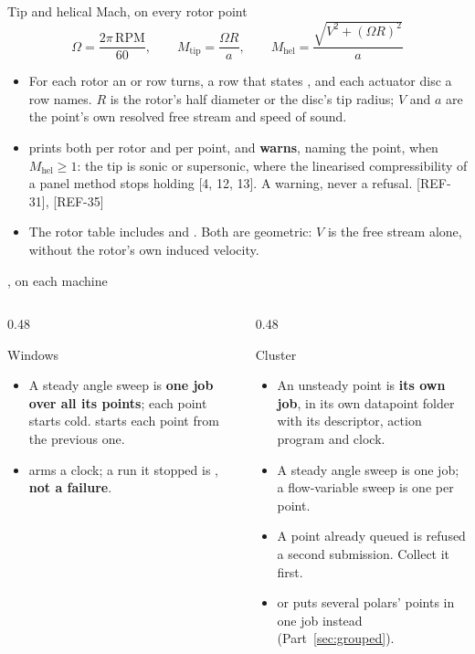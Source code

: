 \begin{frame}{Tip and helical Mach, on every rotor point}
\[ \Omega = \frac{2\pi\,\mathrm{RPM}}{60}, \qquad
   M_\mathrm{tip} = \frac{\Omega R}{a}, \qquad
   M_\mathrm{hel} = \frac{\sqrt{V^2 + (\Omega R)^2}}{a} \]
\begin{itemize}\small
  \item For each rotor an  or  row
        turns, a  row that states , and each actuator
        disc a row names. \(R\)
        is the rotor's half diameter or the disc's tip radius; \(V\) and
        \(a\) are the point's own resolved free stream and speed of sound.
  \item {} prints both per rotor and per point, and \textbf{warns},
        naming the point, when \(M_\mathrm{hel} \ge 1\): the tip is sonic or
        supersonic, where the linearised compressibility of a panel method
        stops holding [4, 12, 13]. A warning, never a refusal. [REF-31], [REF-35]
  \item The rotor table includes  and
        . Both are geometric: \(V\) is the free stream
        alone, without the rotor's own induced velocity.
\end{itemize}
\end{frame}

\begin{frame}{, on each machine}
\begin{columns}[T]
\begin{column}{0.48\textwidth}
\begin{block}{Windows}
\begin{itemize}\small
  \item A steady angle sweep is \textbf{one job over all its points}; each
        point starts cold.  starts each point from
        the previous one.
  \item {} arms a clock; a run it stopped is
        , \textbf{not a failure}.
\end{itemize}
\end{block}
\end{column}
\begin{column}{0.48\textwidth}
\begin{block}{Cluster}
\begin{itemize}\small
  \item An unsteady point is \textbf{its own job}, in its own datapoint folder
        with its descriptor, action program and clock.
  \item A steady angle sweep is one job; a flow-variable sweep is one per point.
  \item A point already queued is refused a second submission. Collect it
        first.
  \item {} or  puts several polars' points
        in one job instead (Part~\ref{sec:grouped}).
\end{itemize}
\end{block}
\end{column}
\end{columns}
\end{frame}


